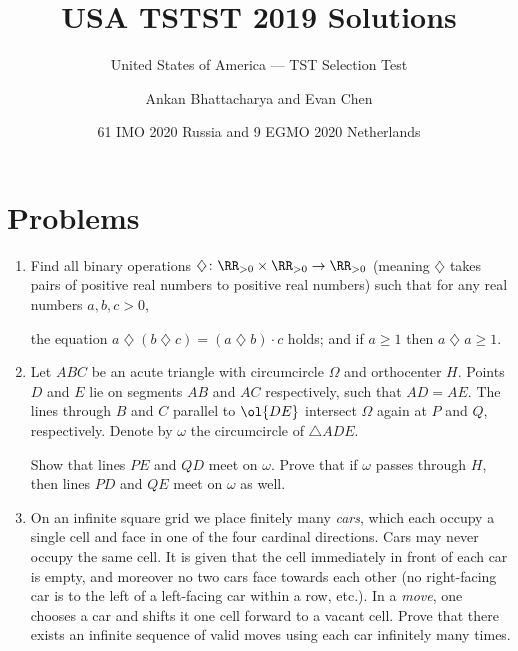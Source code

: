 \documentclass[11pt]{scrartcl}
\begin{document}
\title{USA TSTST 2019 Solutions}
\subtitle{United States of America --- TST Selection Test}
\author{Ankan Bhattacharya and Evan Chen}
\date{61 IMO 2020 Russia and 9 EGMO 2020 Netherlands}

\maketitle

\tableofcontents
\newpage

\addtocounter{section}{-1}
\section{Problems}
\begin{enumerate}[\bfseries 1.]
\item %
\def\di{\mathbin{\diamondsuit}}
Find all binary operations $\di \colon \RR_{>0} \times \RR_{>0} \to \RR_{>0}$
(meaning $\di$ takes pairs of
positive real numbers to positive real numbers)
such that for any real numbers $a,b,c > 0$,
\begin{itemize}
  \ii the equation $a \di (b \di c) = (a \di b) \cdot c$ holds; and
  \ii if $a \ge 1$ then $a \di a \ge 1$.
\end{itemize}

\item %
Let $ABC$ be an acute triangle with circumcircle $\Omega$
and orthocenter $H$.
Points $D$ and $E$ lie on segments $AB$ and $AC$
respectively, such that $AD = AE$.
The lines through $B$ and $C$ parallel to $\ol{DE}$
intersect $\Omega$ again at $P$ and $Q$, respectively.
Denote by $\omega$ the circumcircle of $\triangle ADE$.
\begin{enumerate}[(a)]
  \ii Show that lines $PE$ and $QD$ meet on $\omega$.
  \ii Prove that if $\omega$ passes through $H$,
  then lines $PD$ and $QE$ meet on $\omega$ as well.
\end{enumerate}

\item %
On an infinite square grid we place finitely many \emph{cars},
which each occupy a single cell and face in one of the four cardinal directions.
Cars may never occupy the same cell.
It is given that the cell immediately in front of each car is empty,
and moreover no two cars face towards each other
(no right-facing car is to the left of a left-facing car within a row, etc.).
In a \emph{move}, one chooses a car and shifts it one cell forward to a vacant cell.
Prove that there exists an infinite sequence of valid moves
using each car infinitely many times.


\end{enumerate}
\end{document}
